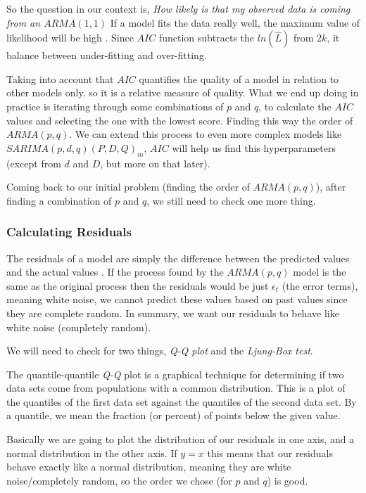 \documentclass[journal]{IEEEtran}
\begin{document}
So the question in our context is, \emph{How likely is that my observed data
is coming from an $ARMA(1,1)$} If a model fits the data really well, the
maximum value of likelihood will be high \cite{timeseries}. Since $AIC$
function subtracts the $ln(\hat{L})$ from $2k$, it balance between
under-fitting and over-fitting.

Taking into account that $AIC$ quantifies the quality of a model in relation
to other models only.  so it is a relative measure of quality.  What we end
up doing in practice is iterating through some combinations of $p$ and $q$,
to calculate the $AIC$ values and selecting the one with the lowest score.
Finding this way the order of $ARMA(p,q)$. We can extend this process to
even more complex models like $SARIMA(p,d,q)(P,D,Q)_m$, $AIC$ will help us
find this hyperparameters (except from $d$ and $D$, but more on that later).

Coming back to our initial problem (finding the order of $ARMA(p,q)$), after
finding a combination of $p$ and $q$, we still need to check one more thing.

\subsubsection{Calculating Residuals}\label{sub:resid}

The residuals of a model are simply the difference between the predicted
values and the actual values \cite{timeseries}.  If the process found by the
$ARMA(p,q)$ model is the same as the original process then the residuals would
be just $\epsilon_t$ (the error terms), meaning white noise, we cannot
predict these values based on past values since they are complete random. In
summary, we want our residuals to behave like white noise (completely random).

We will need to check for two things, \emph{Q-Q plot} and the \emph{Ljung-Box
test}.

The quantile-quantile \emph{Q-Q} plot is a graphical technique for determining
if two data sets come from populations with a common distribution.  This is a
plot of the quantiles of the first data set against the quantiles of the
second data set. By a quantile, we mean the fraction (or percent) of points
below the given value. \cite{qq}

Basically we are going to plot the distribution of our residuals in one axis,
and a normal distribution in the other axis. If $y=x$ this means that our
residuals behave exactly like a normal distribution, meaning they are white
noise/completely random, so the order we chose (for $p$ and $q$) is good.
\end{document}
